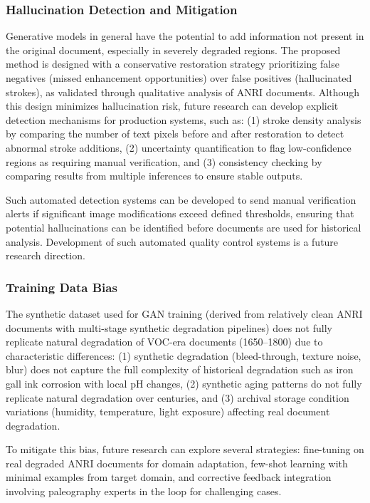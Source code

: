 \documentclass[journal]{IEEEtran}
\begin{document}
\subsubsection{Hallucination Detection and Mitigation}

Generative models in general have the potential to add information not present in the original document, especially in severely degraded regions. The proposed method is designed with a conservative restoration strategy prioritizing false negatives (missed enhancement opportunities) over false positives (hallucinated strokes), as validated through qualitative analysis of ANRI documents. Although this design minimizes hallucination risk, future research can develop explicit detection mechanisms for production systems, such as: (1) stroke density analysis by comparing the number of text pixels before and after restoration to detect abnormal stroke additions, (2) uncertainty quantification to flag low-confidence regions as requiring manual verification, and (3) consistency checking by comparing results from multiple inferences to ensure stable outputs.

Such automated detection systems can be developed to send manual verification alerts if significant image modifications exceed defined thresholds, ensuring that potential hallucinations can be identified before documents are used for historical analysis. Development of such automated quality control systems is a future research direction.

\subsubsection{Training Data Bias}

The synthetic dataset used for GAN training (derived from relatively clean ANRI documents with multi-stage synthetic degradation pipelines) does not fully replicate natural degradation of VOC-era documents (1650--1800) due to characteristic differences: (1) synthetic degradation (bleed-through, texture noise, blur) does not capture the full complexity of historical degradation such as iron gall ink corrosion with local pH changes, (2) synthetic aging patterns do not fully replicate natural degradation over centuries, and (3) archival storage condition variations (humidity, temperature, light exposure) affecting real document degradation.

To mitigate this bias, future research can explore several strategies: fine-tuning on real degraded ANRI documents for domain adaptation, few-shot learning with minimal examples from target domain, and corrective feedback integration involving paleography experts in the loop for challenging cases.
\end{document}
